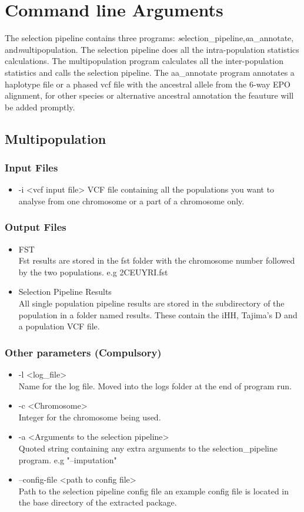 \documentclass[a4paper,10pt]{article}
\begin{document}
\section{Command line Arguments}
The selection pipeline contains three programs: \emph selection\_pipeline,\emph aa\_annotate, and\emph multipopulation. The selection pipeline does all the intra-population statistics calculations. The multipopulation program calculates all the inter-population statistics and calls the selection pipeline. The aa\_annotate program annotates a haplotype file or a phased vcf file with the ancestral allele from the 6-way EPO alignment, for other species or alternative ancestral annotation the feauture will be added promptly.
\subsection{Multipopulation}
\subsubsection{Input Files}
\begin{itemize}
\item -i <vcf input file>
VCF file containing all the populations you want to analyse from one chromosome or a part of a chromosome only. 
\end{itemize}
\subsubsection{Output Files}
\begin{itemize}
\item FST \\
Fst results are stored in the fst folder with the chromosome number followed by the two populations. e.g 2CEUYRI.fst
\item Selection Pipeline Results\\
All single population pipeline results are stored in the subdirectory of the population in a folder named results. These contain the iHH, Tajima's D and a population VCF file.
\end{itemize}
\subsubsection{Other parameters (Compulsory)}
\begin{itemize}
\item -l <log\_file> \\
Name for the log file. Moved into the logs folder at the end of program run.
\item -c <Chromosome>\\
Integer for the chromosome being used.
\item -a <Arguments to the selection pipeline>\\
Quoted string containing any extra arguments to the selection\_pipeline program. e.g "--imputation"
\item --config-file <path to config file>\\
Path to the selection pipeline config file an example config file is located in the base directory of the extracted package.
\end{itemize}
\end{document}
